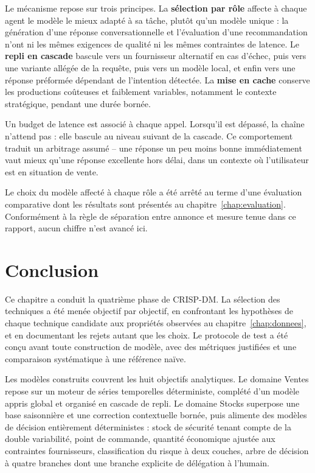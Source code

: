 Le mécanisme repose sur trois principes. La \textbf{sélection par rôle} affecte à chaque agent le modèle le mieux adapté à sa tâche, plutôt qu'un modèle unique : la génération d'une réponse conversationnelle et l'évaluation d'une recommandation n'ont ni les mêmes exigences de qualité ni les mêmes contraintes de latence. Le \textbf{repli en cascade} bascule vers un fournisseur alternatif en cas d'échec, puis vers une variante allégée de la requête, puis vers un modèle local, et enfin vers une réponse préformée dépendant de l'intention détectée. La \textbf{mise en cache} conserve les productions coûteuses et faiblement variables, notamment le contexte stratégique, pendant une durée bornée.

Un budget de latence est associé à chaque appel. Lorsqu'il est dépassé, la chaîne n'attend pas : elle bascule au niveau suivant de la cascade. Ce comportement traduit un arbitrage assumé -- une réponse un peu moins bonne immédiatement vaut mieux qu'une réponse excellente hors délai, dans un contexte où l'utilisateur est en situation de vente.

Le choix du modèle affecté à chaque rôle a été arrêté au terme d'une évaluation comparative dont les résultats sont présentés au chapitre~\ref{chap:evaluation}. Conformément à la règle de séparation entre annonce et mesure tenue dans ce rapport, aucun chiffre n'est avancé ici.

\section*{Conclusion}

Ce chapitre a conduit la quatrième phase de CRISP-DM. La sélection des techniques a été menée objectif par objectif, en confrontant les hypothèses de chaque technique candidate aux propriétés observées au chapitre~\ref{chap:donnees}, et en documentant les rejets autant que les choix. Le protocole de test a été conçu avant toute construction de modèle, avec des métriques justifiées et une comparaison systématique à une référence naïve.

Les modèles construits couvrent les huit objectifs analytiques. Le domaine Ventes repose sur un moteur de séries temporelles déterministe, complété d'un modèle appris global et organisé en cascade de repli. Le domaine Stocks superpose une base saisonnière et une correction contextuelle bornée, puis alimente des modèles de décision entièrement déterministes : stock de sécurité tenant compte de la double variabilité, point de commande, quantité économique ajustée aux contraintes fournisseurs, classification du risque à deux couches, arbre de décision à quatre branches dont une branche explicite de délégation à l'humain.

